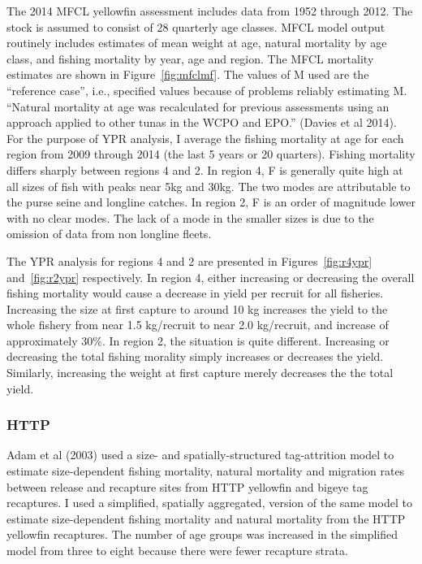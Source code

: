 \documentclass[12pt,letterpaper]{article}
\begin{document}
The 2014 MFCL yellowfin assessment includes data from 1952 through
2012. The stock is assumed to consist of 28 quarterly age classes. 
MFCL model output routinely includes estimates of mean weight at age,
natural mortality by age class, and fishing mortality by year, age
and region. 
The MFCL mortality estimates are shown in Figure~\ref{fig:mfclmf}. 
The values of M used are the ``reference case'', i.e., 
specified values because of problems reliably estimating M. 
``Natural mortality at age was recalculated for previous assessments
using an approach applied to other tunas in the WCPO and EPO.'' (Davies
et al 2014).
For the purpose of YPR analysis, I average the fishing
mortality at age for each region from 2009 through 2014 (the last 5
years or 20 quarters). 
Fishing mortality differs sharply between regions 4 and 2. In region
4, F is generally quite high at all sizes of fish with peaks near 5kg
and 30kg. The two modes are attributable to the purse seine and
longline catches.
In region 2, F is an order of magnitude lower with no clear
modes. The lack of a mode in the smaller sizes is due to the omission
of data from non longline fleets.

The YPR analysis for regions 4 and 2 are
presented in Figures~\ref{fig:r4ypr} and~\ref{fig:r2ypr} respectively.
In region 4, either increasing or decreasing the overall fishing
mortality would cause a decrease in yield per recruit for all
fisheries.
Increasing the size at first capture to around 10 kg increases the
yield to the whole fishery from near 1.5 kg/recruit to near 2.0
kg/recruit, and increase of approximately 30\%.
In region 2, the situation is quite different. 
Increasing or decreasing the total fishing morality simply increases
or decreases the yield.
Similarly, increasing the weight at first capture merely decreases the
the total yield.

\subsubsection*{HTTP}
Adam et al (2003) used a size- and spatially-structured
tag-attrition model to estimate
size-dependent fishing mortality, natural
mortality and migration rates between release and recapture sites from
HTTP yellowfin and bigeye tag recaptures. 
I used a simplified, spatially aggregated, version of the same
model to estimate size-dependent fishing
mortality and natural mortality from the HTTP yellowfin recaptures.
The number of age groups was increased in the simplified model
from three to
eight because there were fewer recapture strata.
\end{document}
